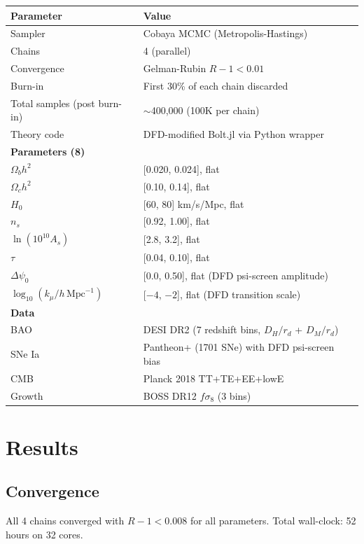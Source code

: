 \documentclass[11pt,a4paper]{article}
\begin{document}
\begin{center}
\begin{tabular}{ll}
\toprule
\textbf{Parameter} & \textbf{Value} \\
\midrule
Sampler & Cobaya MCMC (Metropolis-Hastings) \\
Chains & 4 (parallel) \\
Convergence & Gelman-Rubin $R - 1 < 0.01$ \\
Burn-in & First 30\% of each chain discarded \\
Total samples (post burn-in) & $\sim$400{,}000 (100K per chain) \\
Theory code & DFD-modified Bolt.jl via Python wrapper \\
\midrule
\textbf{Parameters (8)} & \\
$\Omega_b h^2$ & [0.020, 0.024], flat \\
$\Omega_c h^2$ & [0.10, 0.14], flat \\
$H_0$ & [60, 80] km/s/Mpc, flat \\
$n_s$ & [0.92, 1.00], flat \\
$\ln(10^{10} A_s)$ & [2.8, 3.2], flat \\
$\tau$ & [0.04, 0.10], flat \\
$\Delta\psi_0$ & [0.0, 0.50], flat (DFD psi-screen amplitude) \\
$\log_{10}(k_\mu/h\,\text{Mpc}^{-1})$ & [$-4$, $-2$], flat (DFD transition scale) \\
\midrule
\textbf{Data} & \\
BAO & DESI DR2 (7 redshift bins, $D_H/r_d$ + $D_M/r_d$) \\
SNe Ia & Pantheon+ (1701 SNe) with DFD psi-screen bias \\
CMB & Planck 2018 TT+TE+EE+lowE \\
Growth & BOSS DR12 $f\sigma_8$ (3 bins) \\
\bottomrule
\end{tabular}
\end{center}

\section{Results}

\subsection{Convergence}

All 4 chains converged with $R - 1 < 0.008$ for all parameters. Total wall-clock: 52 hours on 32 cores.
\end{document}
